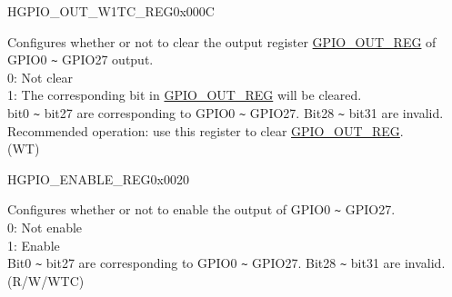 \begin{register}{H}{GPIO\_OUT\_W1TC\_REG}{0x000C}\label{regdesc:GPIOOUTW1TCREG}
%
\regnewline%
\begin{regdesc}\begin{reglist}
\label{fielddesc:GPIOOUTW1TC}\item [GPIO\_OUT\_W1TC] Configures whether or not to clear the output register \hyperref[regdesc:GPIOOUTREG]{GPIO\_OUT\_REG} of GPIO0 \verb+~+ GPIO27 output.\\
0: Not clear\\
1: The corresponding bit in \hyperref[regdesc:GPIOOUTREG]{GPIO\_OUT\_REG} will be cleared.\\
bit0 \verb+~+ bit27 are corresponding to GPIO0 \verb+~+ GPIO27. Bit28 \verb+~+ bit31 are invalid.
Recommended operation: use this register to clear \hyperref[regdesc:GPIOOUTREG]{GPIO\_OUT\_REG}. \\
(WT)
\end{reglist}\end{regdesc}
\end{register}


\begin{register}{H}{GPIO\_ENABLE\_REG}{0x0020}\label{regdesc:GPIOENABLEREG}
%
\regnewline%
\begin{regdesc}\begin{reglist}
\label{fielddesc:GPIOENABLEDATA}\item [GPIO\_ENABLE\_DATA] Configures whether or not to enable the output of GPIO0 \verb+~+ GPIO27.\\
0: Not enable\\
1: Enable\\
Bit0 \verb+~+ bit27 are corresponding to GPIO0 \verb+~+ GPIO27. Bit28 \verb+~+ bit31 are invalid.\\
(R/W/WTC)
\end{reglist}\end{regdesc}
\end{register}


